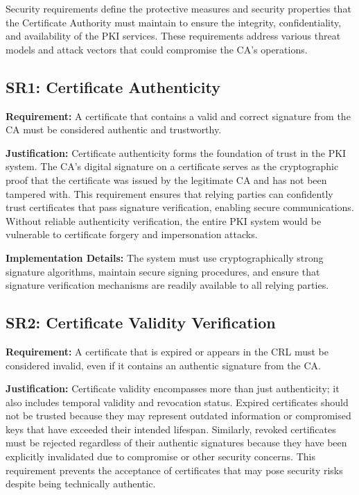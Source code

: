 Security requirements define the protective measures and security properties that the Certificate Authority must maintain to ensure the integrity, confidentiality, and availability of the PKI services. These requirements address various threat models and attack vectors that could compromise the CA's operations.

\subsection{SR1: Certificate Authenticity}

\textbf{Requirement:} A certificate that contains a valid and correct signature from the CA must be considered authentic and trustworthy.

\textbf{Justification:} Certificate authenticity forms the foundation of trust in the PKI system. The CA's digital signature on a certificate serves as the cryptographic proof that the certificate was issued by the legitimate CA and has not been tampered with. This requirement ensures that relying parties can confidently trust certificates that pass signature verification, enabling secure communications. Without reliable authenticity verification, the entire PKI system would be vulnerable to certificate forgery and impersonation attacks.

\textbf{Implementation Details:} The system must use cryptographically strong signature algorithms, maintain secure signing procedures, and ensure that signature verification mechanisms are readily available to all relying parties.

\subsection{SR2: Certificate Validity Verification}

\textbf{Requirement:} A certificate that is expired or appears in the CRL must be considered invalid, even if it contains an authentic signature from the CA.

\textbf{Justification:} Certificate validity encompasses more than just authenticity; it also includes temporal validity and revocation status. Expired certificates should not be trusted because they may represent outdated information or compromised keys that have exceeded their intended lifespan. Similarly, revoked certificates must be rejected regardless of their authentic signatures because they have been explicitly invalidated due to compromise or other security concerns. This requirement prevents the acceptance of certificates that may pose security risks despite being technically authentic.


